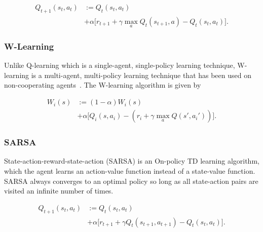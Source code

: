 \documentclass[journal]{IEEEtran}
\begin{document}

\begin{equation}\label{eqn1}
\begin{split}
Q_{t + 1}(s_t, a_t) &:= Q_{t}(s_t, a_t)\\
& + \alpha \Big[ r_{t + 1} + \gamma \max_{a}  Q_{t}(s_{t + 1}, a) -  Q_{t}(s_t, a_t) \Big].
   \end{split}
\end{equation}



\subsubsection{W-Learning}
Unlike Q-learning which is a single-agent, single-policy learning technique, W-learning is a multi-agent, multi-policy learning technique that has been used on non-cooperating agents~\cite{Dusparic2009}. The W-learning algorithm is given by

\begin{equation}\label{eqn2}
\begin{split}
W_{i}(s) &:= (1 - \alpha)W_{i}(s) \\
& + \alpha \Big[ Q_{i}(s, a_i)  - (r_i + \gamma \max_{a}  Q(s', a_i')) \Big].
   \end{split}
\end{equation}


\subsubsection{SARSA}
State-action-reward-state-action (SARSA) is an On-policy TD learning algorithm, which the agent learns an action-value function instead of a state-value function. SARSA always converges to an optimal policy so long as all state-action pairs are visited an infinite number of times.

\begin{equation}\label{eqn3}
\begin{split}
Q_{t + 1}(s_t, a_t) &:= Q_{t}(s_t, a_t)\\
& + \alpha \Big[ r_{t + 1} + \gamma Q_{t}(s_{t + 1}, a_{t + 1}) -  Q_{t}(s_t, a_t) \Big].
   \end{split}
\end{equation}
\end{document}
